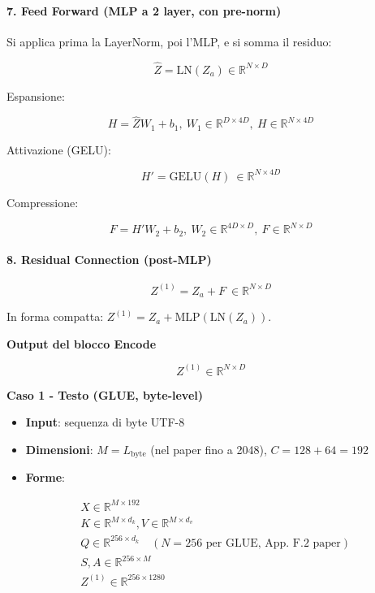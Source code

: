 \documentclass[
  11pt,
]{article}
\begin{document}
\paragraph{7. \textbf{Feed Forward (MLP a 2 layer, con pre-norm)}}

Si applica prima la LayerNorm, poi l'MLP, e si somma il residuo:

\[\widehat{Z} = \mathrm{LN}(Z_{a}) \in \mathbb{R}^{N \times D}\]

Espansione:

\[H = \widehat{Z}W_{1} + b_{1},\ W_{1} \in \mathbb{R}^{D \times 4D},\ H \in \mathbb{R}^{N \times 4D}\]

Attivazione (GELU):

\[H' = \mathrm{GELU}(H)\  \in \mathbb{R}^{N \times 4D}\]

Compressione:

\[F = H'W_{2} + b_{2},\ W_{2} \in \mathbb{R}^{4D \times D},\ F \in \mathbb{R}^{N \times D}\]

\paragraph{8. \textbf{Residual Connection (post-MLP)}}

\[Z^{(1)} = Z_{a} + F\  \in \mathbb{R}^{N \times D}\]

In forma compatta: $Z^{(1)} = Z_{a} + \mathrm{MLP}(\mathrm{LN}(Z_{a}))$.

\textbf{Output del blocco Encode}

\[Z^{(1)} \in \mathbb{R}^{N \times D}\]

\textbf{Caso 1 - Testo (GLUE, byte-level)}

\begin{itemize}
\item
  \textbf{Input}: sequenza di byte UTF-8
\item
  \textbf{Dimensioni}: \(M = L_{\text{byte}}\) (nel paper fino a 2048),
  \(C = 128 + 64 = 192\)
\item
  \textbf{Forme}:
\end{itemize}

\[\begin{matrix}
 & X \in \mathbb{R}^{M \times 192} \\
 & K \in \mathbb{R}^{M \times d_{k}},V \in \mathbb{R}^{M \times d_{v}} \\
 & Q \in \mathbb{R}^{256 \times d_{k}}\quad (N = 256 \text{ per GLUE, App.\ F.2 paper}) \\
 & S,A \in \mathbb{R}^{256 \times M} \\
 & Z^{(1)} \in \mathbb{R}^{256 \times 1280}
\end{matrix}\]
\end{document}
